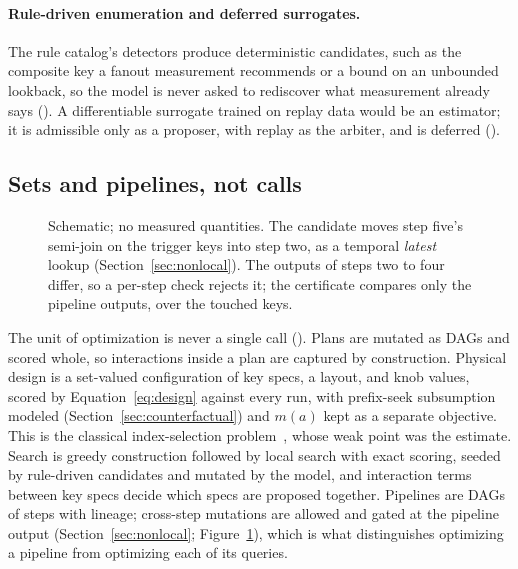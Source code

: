 \paragraph{Rule-driven enumeration and deferred surrogates.} The rule catalog's
detectors produce deterministic candidates, such as the composite key a fanout
measurement recommends or a bound on an unbounded lookback, so the model is
never asked to rediscover what measurement already says
(). A differentiable surrogate trained on replay data would
be an estimator; it is admissible only as a proposer, with replay as the
arbiter, and is deferred ().

\subsection{Sets and pipelines, not calls}\label{sec:sets}

\begin{figure}[t]
  \centering
  
  \caption{Schematic; no measured quantities. The candidate moves step five's
    semi-join on the trigger keys into step two, as a temporal \emph{latest}
    lookup (Section~\ref{sec:nonlocal}). The outputs of steps two to four
    differ, so a per-step check rejects it; the certificate compares only the
    pipeline outputs, over the touched keys.}
  \label{fig:schematic-pipeline}
\end{figure}

The unit of optimization is never a single call (). Plans are mutated
as DAGs and scored whole, so interactions inside a plan are captured by
construction. Physical design is a set-valued configuration of key specs, a
layout, and knob values, scored by Equation~\eqref{eq:design} against every
run, with prefix-seek subsumption modeled (Section~\ref{sec:counterfactual})
and $m(a)$ kept as a separate objective. This is the classical index-selection
problem~\cite{autoadmin1997,bruno2005relax}, whose weak point was the estimate.
Search is greedy construction followed by local search with exact scoring,
seeded by rule-driven candidates and mutated by the model, and interaction terms
between key specs decide which specs are proposed together. Pipelines are DAGs
of steps with lineage; cross-step mutations are allowed and gated at the
pipeline output (Section~\ref{sec:nonlocal}; Figure~\ref{fig:schematic-pipeline}),
which is what distinguishes optimizing a pipeline from optimizing each of its
queries.

